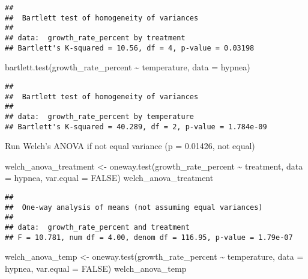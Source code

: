 \documentclass[
]{article}
\newenvironment{Shaded}{\begin{snugshade}}{\end{snugshade}}
\newcommand{\AttributeTok}[1]{\textcolor[rgb]{0.77,0.63,0.00}{#1}}
\newcommand{\ConstantTok}[1]{\textcolor[rgb]{0.00,0.00,0.00}{#1}}
\newcommand{\FunctionTok}[1]{\textcolor[rgb]{0.00,0.00,0.00}{#1}}
\newcommand{\NormalTok}[1]{#1}
\newcommand{\OtherTok}[1]{\textcolor[rgb]{0.56,0.35,0.01}{#1}}
\newcommand{\SpecialCharTok}[1]{\textcolor[rgb]{0.00,0.00,0.00}{#1}}
\begin{document}
\begin{verbatim}
## 
##  Bartlett test of homogeneity of variances
## 
## data:  growth_rate_percent by treatment
## Bartlett's K-squared = 10.56, df = 4, p-value = 0.03198
\end{verbatim}

\begin{Shaded}
\begin{Highlighting}[]
\FunctionTok{bartlett.test}\NormalTok{(growth\_rate\_percent }\SpecialCharTok{\textasciitilde{}}\NormalTok{ temperature, }\AttributeTok{data =}\NormalTok{ hypnea)}
\end{Highlighting}
\end{Shaded}

\begin{verbatim}
## 
##  Bartlett test of homogeneity of variances
## 
## data:  growth_rate_percent by temperature
## Bartlett's K-squared = 40.289, df = 2, p-value = 1.784e-09
\end{verbatim}

Run Welch's ANOVA if not equal variance (p = 0.01426, not equal)

\begin{Shaded}
\begin{Highlighting}[]
\NormalTok{welch\_anova\_treatment }\OtherTok{\textless{}{-}} \FunctionTok{oneway.test}\NormalTok{(growth\_rate\_percent }\SpecialCharTok{\textasciitilde{}}\NormalTok{ treatment, }\AttributeTok{data =}\NormalTok{ hypnea, }\AttributeTok{var.equal =} \ConstantTok{FALSE}\NormalTok{)}
\NormalTok{welch\_anova\_treatment}
\end{Highlighting}
\end{Shaded}

\begin{verbatim}
## 
##  One-way analysis of means (not assuming equal variances)
## 
## data:  growth_rate_percent and treatment
## F = 10.781, num df = 4.00, denom df = 116.95, p-value = 1.79e-07
\end{verbatim}

\begin{Shaded}
\begin{Highlighting}[]
\NormalTok{welch\_anova\_temp }\OtherTok{\textless{}{-}} \FunctionTok{oneway.test}\NormalTok{(growth\_rate\_percent }\SpecialCharTok{\textasciitilde{}}\NormalTok{ temperature, }\AttributeTok{data =}\NormalTok{ hypnea, }\AttributeTok{var.equal =} \ConstantTok{FALSE}\NormalTok{)}
\NormalTok{welch\_anova\_temp}
\end{Highlighting}
\end{Shaded}
\end{document}
